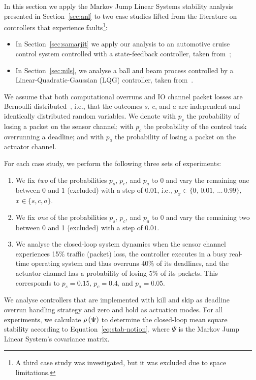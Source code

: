 In this section we apply the Markov Jump Linear Systems stability analysis presented in Section~\ref{sec:anl} to two case studies lifted from the literature on controllers that experience faults\footnote{A third case study was investigated, but it was excluded due to space limitations.}:
\begin{itemize}
    \item In Section~\ref{sec:samarjit} we apply our analysis to an automotive cruise control system controlled with a state-feedback controller, taken from~\cite{Ghosh:2018};
    \item In Section~\ref{sec:nils}, we analyse a ball and beam process controlled by a Linear-Quadratic-Gaussian (LQG) controller, taken from~\cite{Vreman:2022}.
\end{itemize}
We assume that both computational overruns and IO channel packet losses are Bernoulli distributed~\cite{Schenato:2007}, i.e., that the outcomes $s$, $c$, and $a$ are independent and identically distributed random variables.
We denote with $p_s$ the probability of losing a packet on the sensor channel; with $p_c$ the probability of the control task overrunning a deadline; and with $p_a$ the probability of losing a packet on the actuator channel.

For each case study, we perform the following three sets of experiments:
%
\begin{enumerate}[label=(\roman*)]
    \item \label{exp:twofixed} We fix \emph{two} of the probabilities $p_s$, $p_c$, and $p_a$ to $0$ and vary the remaining one between $0$ and $1$ (excluded) with a step of $0.01$, i.e., $p_x \in \{0,\,0.01,\,\dots\,0.99\}$, $x \in \{ s, c, a \}$.

    \item \label{exp:onefixed} We fix \emph{one} of the probabilities $p_s$, $p_c$, and $p_a$ to $0$ and vary the remaining two between 0 and 1 (excluded) with a step of $0.01$.

    \item \label{exp:nonefixed} We analyse the closed-loop system dynamics when the sensor channel experiences 15\% traffic (packet) loss, the controller executes in a busy real-time operating system and thus overruns 40\% of its deadlines, and the actuator channel has a probability of losing 5\% of its packets.
        This corresponds to $p_s=0.15$, $p_c=0.4$, and $p_a = 0.05$.
\end{enumerate}
%
We analyse controllers that are implemented with kill and skip as deadline overrun handling strategy and zero and hold as actuation modes.
For all experiments, we calculate $\rho\left( \Psi \right)$ to determine the closed-loop mean square stability according to Equation~\eqref{eq:stab-notion}, where $\Psi$ is the Markov Jump Linear System's covariance matrix.

